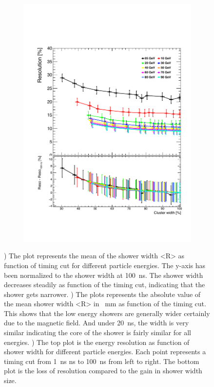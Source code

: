\begin{figure}[htbp!]
  \begin{minipage}{.45\textwidth}
    \centering
    \begin{subfigure}[t]{1\textwidth}
      \centering
      \includegraphics[width=1\linewidth]{chap6/fig_TimingILD/NoSmearing/ShowerWidth_Resolution_noSmearing}
      \vspace{-6ex}
      \caption{}  \label{fig:ShowerWidthResoNoSmearing}
    \end{subfigure}
  \end{minipage}
  \caption{) The plot represents the mean of the shower width <R> as function of timing cut for different particle energies. The y-axis has been normalized to the shower width at \SI{100}{\nano\second}. The shower width decreases steadily as function of the timing cut, indicating that the shower gets narrower. ) The plots represents the absolute value of the mean shower width <R> in \SI{}{\milli\meter} as function of the timing cut. This shows that the low energy showers are generally wider certainly due to the magnetic field. And under \SI{20}{\nano\second}, the width is very similar indicating the core of the shower is fairly similar for all energies. ) The top plot is the energy resolution as function of shower width for different particle energies. Each point represents a timing cut from \SI{1}{\nano\second} ns to \SI{100}{\nano\second} from left to right. The bottom plot is the loss of resolution compared to the gain in shower width size.}
\end{figure}

